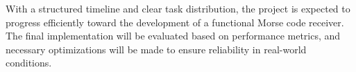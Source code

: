 \documentclass{cce2014-design}
\begin{document}
With a structured timeline and clear task distribution, the project is expected to progress efficiently toward the development of a functional Morse code receiver. The final implementation will be evaluated based on performance metrics, and necessary optimizations will be made to ensure reliability in real-world conditions.




\begin{bibliography}

\end{bibliography}
\end{document}
